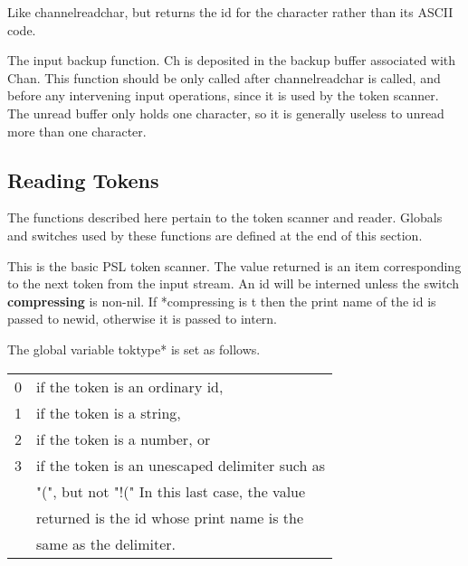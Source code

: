 {    Like channelreadchar, but returns the id for  the  character
    rather than its ASCII code.
}

{}

{   
    The  input  backup  function.  Ch is deposited in the backup
    buffer associated with Chan.  This function should  be  only
    called  after  channelreadchar  is  called,  and  before any
    intervening input operations, since it is used by the  token
    scanner.   The unread buffer only holds one character, so it
    is generally useless to unread more than one character.
}

\subsection{Reading Tokens}

  The functions described here pertain to the token scanner  and
reader.   Globals  and  switches  used  by  these  functions are
defined at the end of this section.

{    
    This is the basic PSL token scanner.  The value returned  is
    an  item  corresponding  to  the  next  token from the input
    stream.    An  id  will  be  interned  unless   the   switch
    {\bf *compressing} is  non-nil. 
    If *compressing is t then the
    print name of the id is passed to  newid,  otherwise  it  is
    passed  to  intern.  
}

 	The global variable toktype*  is set as
    follows.

\begin{tabular}{ll}
    0 &             if the token is an ordinary id,\\

    1 &            if the token is a string,\\

    2 &             if the token is a number, or\\

    3 &             if the token is an unescaped delimiter such as\\
      &            "(", but not "!(" In this last case, the value\\
      &            returned is the id whose  print  name  is  the\\
      &            same as the delimiter.\\
\end{tabular}

